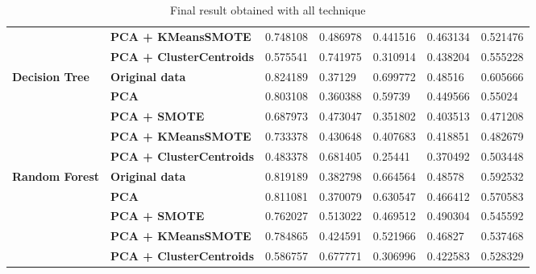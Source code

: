 \documentclass{article}
\begin{document}
\begin{table}[H]
\begin{tabular}{lllllll}
                                                 & \textbf{PCA + KMeansSMOTE }       & 0.748108          & 0.486978        & 0.441516           & 0.463134          & 0.521476     \\
                                                 & \textbf{PCA + ClusterCentroids } & 0.575541          & 0.741975        & 0.310914           & 0.438204          & 0.555228     \\ \hline
\multirow{5}{*}{\textbf{Decision Tree}}          & \textbf{Original data}                        & 0.824189          & 0.37129         & 0.699772           & 0.48516           & 0.605666     \\ 
                                                 & \textbf{PCA}                                  & 0.803108          & 0.360388        & 0.59739            & 0.449566          & 0.55024      \\
                                                 & \textbf{PCA + SMOTE }             & 0.687973          & 0.473047        & 0.351802           & 0.403513          & 0.471208     \\
                                                 & \textbf{PCA + KMeansSMOTE }       & 0.733378          & 0.430648        & 0.407683           & 0.418851          & 0.482679     \\
                                                 & \textbf{PCA + ClusterCentroids } & 0.483378          & 0.681405        & 0.25441            & 0.370492          & 0.503448     \\ \hline
\multirow{5}{*}{\textbf{Random Forest}}          & \textbf{Original data}                        & 0.819189          & 0.382798        & 0.664564           & 0.48578           & 0.592532     \\ 
                                                 & \textbf{PCA}                                  & 0.811081          & 0.370079        & 0.630547           & 0.466412          & 0.570583     \\
                                                 & \textbf{PCA + SMOTE }             & 0.762027          & 0.513022        & 0.469512           & 0.490304          & 0.545592     \\
                                                 & \textbf{PCA + KMeansSMOTE }       & 0.784865          & 0.424591        & 0.521966           & 0.46827           & 0.537468     \\
                                                 & \textbf{PCA + ClusterCentroids } & 0.586757          & 0.677771        & 0.306996           & 0.422583          & 0.528329    
\end{tabular}
\caption{Final result obtained with all technique}
\end{table}
\end{document}

